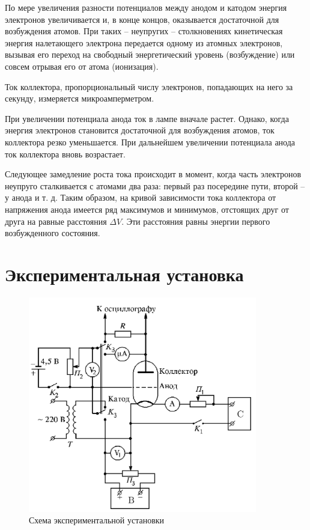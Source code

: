 \documentclass[12pt,a4paper]{article}
\begin{document}
	По мере увеличения разности потенциалов между анодом и катодом энергия электронов увеличивается и, в конце концов, оказывается достаточной для возбуждения атомов. При таких -- неупругих -- столкновениях кинетическая энергия налетающего электрона передается одному из атомных электронов, вызывая его переход на свободный энергетический уровень (возбуждение) или совсем отрывая его от атома (ионизация).
	
	Ток коллектора, пропорциональный числу электронов, попадающих на него за секунду, измеряется микроамперметром.

	При увеличении потенциала анода ток в лампе вначале растет. Однако, когда энергия электронов становится достаточной для возбуждения атомов, ток коллектора резко уменьшается. При дальнейшем увеличении потенциала анода ток коллектора вновь возрастает.

	Следующее замедление роста тока происходит в момент, когда часть
	электронов неупруго сталкивается с атомами два раза: первый раз посередине пути, второй -- у анода и т. д. Таким образом, на кривой зависимости тока коллектора от напряжения анода имеется ряд максимумов и минимумов, отстоящих друг от друга на равные расстояния $\Delta V$. Эти расстояния равны энергии первого возбужденного состояния.
	
 
	\section*{Экспериментальная установка}

    \begin{figure}[h!]
		\centering
		\includegraphics[width=10cm]{res/circuit.png}
		\caption{Схема экспериментальной установки}
		\label{Circuit}
	\end{figure}
	
\end{document}

